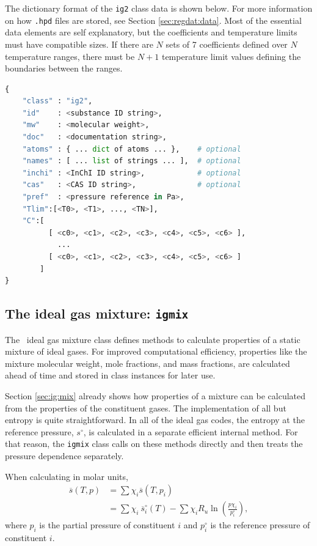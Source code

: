 The dictionary format of the \texttt{ig2} class data is shown below.  For more information on how \texttt{.hpd} files are stored, see Section \ref{sec:regdat:data}.  Most of the essential data elements are self explanatory, but the coefficients and temperature limits must have compatible sizes.  If there are $N$ sets of 7 coefficients defined over $N$ temperature ranges, there must be $N+1$ temperature limit values defining the boundaries between the ranges.  

\begin{lstlisting}[language=Python]
{
    "class" : "ig2",
    "id"    : <substance ID string>,
    "mw"    : <molecular weight>,
    "doc"   : <documentation string>,
    "atoms" : { ... dict of atoms ... },    # optional
    "names" : [ ... list of strings ... ],  # optional
    "inchi" : <InChI ID string>,            # optional
    "cas"   : <CAS ID string>,              # optional
    "pref"  : <pressure reference in Pa>,
    "Tlim":[<T0>, <T1>, ..., <TN>],
    "C":[
          [ <c0>, <c1>, <c2>, <c3>, <c4>, <c5>, <c6> ],
            ...
          [ <c0>, <c1>, <c2>, <c3>, <c4>, <c5>, <c6> ]
        ]
}
\end{lstlisting}

\subsection{The ideal gas mixture: \texttt{igmix}}\label{sec:ig:igmix}

The \PM\ ideal gas mixture class defines methods to calculate properties of a static mixture of ideal gases.  For improved computational efficiency, properties like the mixture molecular weight, mole fractions, and mass fractions, are calculated ahead of time and stored in class instances for later use.

Section \ref{sec:ig:mix} already shows how properties of a mixture can be calculated from the properties of the constituent gases.  The implementation of all but entropy is quite straightforward.  In all of the ideal gas codes, the entropy at the reference pressure, $s^\circ$, is calculated in a separate efficient internal method.  For that reason, the \texttt{igmix} class calls on these methods directly and then treats the pressure dependence separately.

When calculating in molar units,
\begin{align*}
\overline{s}(T,p) &= \sum \chi_i \overline{s}(T, p_i)\\
 &=\sum \chi_i\ \overline{s}^\circ_i(T) - \sum \chi_i R_u \ln\left(\frac{p \chi_i}{p^\circ_i}\right),
\end{align*}
where $p_i$ is the partial pressure of constituent $i$ and $p^\circ_i$ is the reference pressure of constituent $i$.


